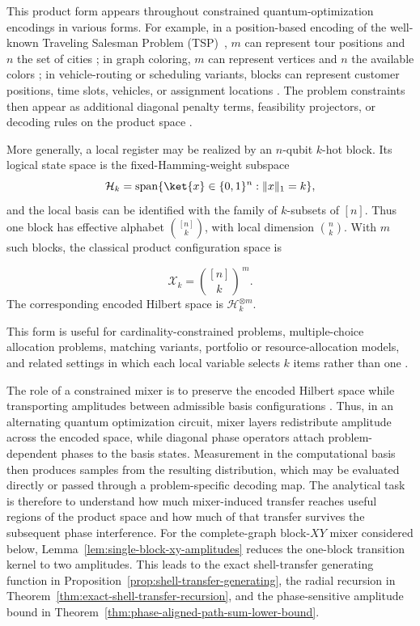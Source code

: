 \documentclass[a4paper,onecolumn,11pt,unpublished]{quantumarticle}
\theoremstyle{remark}
\begin{document}
This product form appears throughout constrained quantum-optimization
encodings in various forms. For example, in a position-based encoding of the  well-known 
Traveling Salesman %
Problem (TSP)~\cite{MillerTuckerZemlin1960}, \(m\) can represent tour positions and \(n\) the set of cities \cite{Lucas2014}; in graph coloring, \(m\) can represent vertices and \(n\) the available colors
\cite{Wang2020XYMixers,Lucas2014}; in vehicle-routing or scheduling variants, blocks can represent customer positions, time slots, vehicles, or assignment locations \cite{onah2026cvrp,TothVigo2014VRP}. The problem constraints then appear as additional diagonal penalty terms, feasibility projectors, or decoding rules on the product space \cite{Hadfield2019AOA,onahce}.

More generally, a local register may be realized by an \(n\)-qubit \(k\)-hot block. Its logical state space is the fixed-Hamming-weight subspace
\begin{equation}
\label{eq:multi-ecit}
\mathcal H_k
=
\mathrm{span}\{\ket{x}\in\{0,1\}^n:\|x\|_1=k\},   
\end{equation}
and the local basis can be identified with the family of
\(k\)-subsets of \([n]\). Thus one block has effective alphabet
\(\binom{[n]}{k}\), with local dimension \(\binom nk\). With \(m\) such blocks,
the classical product configuration space is

\begin{equation}
\label{eq:multi-ecit-cardinality}
\mathcal X_k
=
\binom{[n]}{k}^{\,m}. 
\end{equation}
The corresponding encoded Hilbert space is 
$\mathcal H_k^{\otimes m}$.


This form is useful for cardinality-constrained problems, multiple-choice
allocation problems, matching variants, portfolio or resource-allocation
models, and related settings in which each local variable selects \(k\) items rather than one \cite{Hadfield2019AOA,Cook2019MaxKVertexCover,B_rtschi_2019}.


The role of a constrained mixer is to preserve the encoded Hilbert space while transporting amplitudes between admissible basis configurations \cite{Hadfield2019AOA}. Thus, in an alternating quantum optimization circuit, mixer layers redistribute amplitude across the encoded space, while diagonal phase operators attach problem-dependent phases to the basis states. Measurement in the computational basis then produces samples from the resulting distribution, which may be evaluated directly or passed through a problem-specific decoding map. The analytical task is therefore to understand how much mixer-induced transfer reaches useful regions of the product space and how much of that transfer survives the subsequent phase interference. For the complete-graph block-\(XY\) mixer considered below, Lemma~\ref{lem:single-block-xy-amplitudes} reduces the one-block transition kernel to two amplitudes. This leads to the exact shell-transfer generating function in
Proposition~\ref{prop:shell-transfer-generating}, the radial recursion in
Theorem~\ref{thm:exact-shell-transfer-recursion}, and the phase-sensitive
amplitude bound in Theorem~\ref{thm:phase-aligned-path-sum-lower-bound}.
\end{document}
